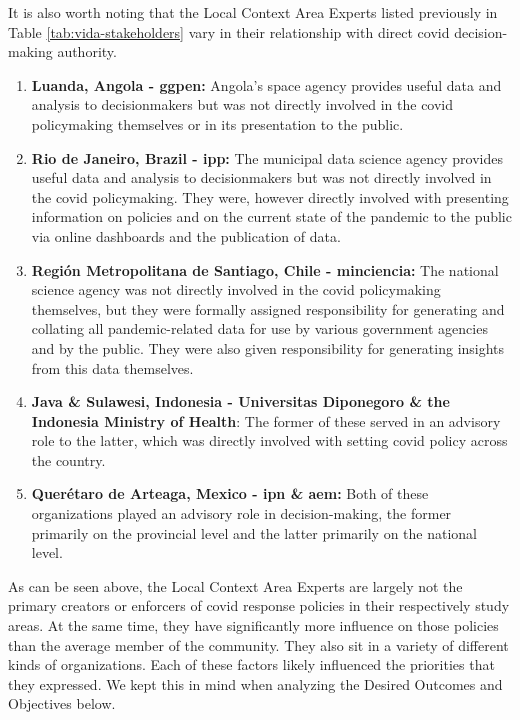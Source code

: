 It is also worth noting that the Local Context Area Experts listed previously in Table \ref{tab:vida-stakeholders} vary in their relationship with direct \ac{covid} decision-making authority. 

\begin{enumerate}[itemsep=0pt,parsep=0pt]
    \item{\textbf{Luanda, Angola - \ac{ggpen}:} Angola's space agency provides useful data and analysis to decisionmakers but was not directly involved in the \ac{covid} policymaking themselves or in its presentation to the public.}  
    \item{\textbf{Rio de Janeiro, Brazil - \ac{ipp}:} The municipal data science agency provides useful data and analysis to decisionmakers but was not directly involved in the \ac{covid} policymaking. They were, however directly involved with presenting information on policies and on the current state of the pandemic to the public via online dashboards and the publication of data.}
    \item{\textbf{Región Metropolitana de Santiago, Chile - \ac{minciencia}:} The national science agency was not directly involved in the \ac{covid} policymaking themselves, but they were formally assigned responsibility for generating and collating all pandemic-related data for use by various government agencies and by the public. They were also given responsibility for generating insights from this data themselves.}
    \item{\textbf{Java \& Sulawesi, Indonesia - Universitas Diponegoro \& the Indonesia Ministry of Health}: The former of these served in an advisory role to the latter, which was directly involved with setting \ac{covid} policy across the country.}
    \item{\textbf{Querétaro de Arteaga, Mexico - \ac{ipn} \& \ac{aem}:} Both of these organizations played an advisory role in decision-making, the former primarily on the provincial level and the latter primarily on the national level.} 
\end{enumerate}

As can be seen above, the Local Context Area Experts are largely not the primary creators or enforcers of \ac{covid} response policies in their respectively study areas. At the same time, they have significantly more influence on those policies than the average member of the community. They also sit in a variety of different kinds of organizations. Each of these factors likely influenced the priorities that they expressed. We kept this in mind when analyzing the Desired Outcomes and Objectives below.

